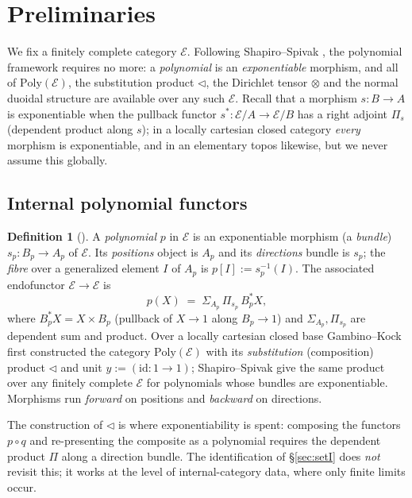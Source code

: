 \documentclass[11pt]{amsart}
\theoremstyle{plain}
\theoremstyle{definition}
\newtheorem{definition}[theorem]{Definition}
\theoremstyle{remark}
\newcommand{\Poly}{\mathrm{Poly}}
\newcommand{\Ee}{\mathcal{E}}
\newcommand{\sub}{\triangleleft}      %
\newcommand{\dir}[1]{[#1]}
\newcommand{\id}{\mathrm{id}}
\begin{document}
\section{Preliminaries}\label{sec:prelim}

We fix a finitely complete category $\Ee$. Following Shapiro--Spivak \cite{ShapiroSpivak2023}, the
polynomial framework requires no more: a \emph{polynomial} is an \emph{exponentiable} morphism, and
all of $\Poly(\Ee)$, the substitution product $\sub$, the Dirichlet tensor $\otimes$ and the normal
duoidal structure are available over any such $\Ee$. Recall that a morphism $s:B\to A$ is
exponentiable when the pullback functor $s^\ast:\Ee/A\to\Ee/B$ has a right adjoint $\Pi_s$ (dependent
product along $s$); in a locally cartesian closed category \emph{every} morphism is exponentiable,
and in an elementary topos likewise, but we never assume this globally.

\subsection{Internal polynomial functors}

\begin{definition}[{\cite{GambinoKock2013,ShapiroSpivak2023}}]
A \emph{polynomial} $p$ in $\Ee$ is an exponentiable morphism (a \emph{bundle}) $s_p:B_p\to A_p$ of
$\Ee$. Its \emph{positions} object is $A_p$ and its \emph{directions} bundle is $s_p$; the
\emph{fibre} over a generalized element $I$ of $A_p$ is $p\dir{I}:=s_p^{-1}(I)$. The associated
endofunctor $\Ee\to\Ee$ is
\[
  p(X)\;=\;\Sigma_{A_p}\,\Pi_{s_p}\,B_p^\ast X,
\]
where $B_p^\ast X=X\times B_p$ (pullback of $X\to1$ along $B_p\to1$) and $\Sigma_{A_p},\Pi_{s_p}$ are
dependent sum and product. Over a locally cartesian closed base Gambino--Kock \cite{GambinoKock2013}
first constructed the category $\Poly(\Ee)$ with its \emph{substitution} (composition) product $\sub$
and unit $y:=(\id:1\to1)$; Shapiro--Spivak \cite[Thm.~3.26]{ShapiroSpivak2023} give the same product
over any finitely complete $\Ee$ for polynomials whose bundles are exponentiable. Morphisms run
\emph{forward} on positions and \emph{backward} on directions.
\end{definition}

The construction of $\sub$ is where exponentiability is spent: composing the functors $p\circ q$ and
re-presenting the composite as a polynomial requires the dependent product $\Pi$ along a direction
bundle. The identification of \S\ref{sec:setI} does \emph{not} revisit this; it works at the level of
internal-category data, where only finite limits occur.
\end{document}
